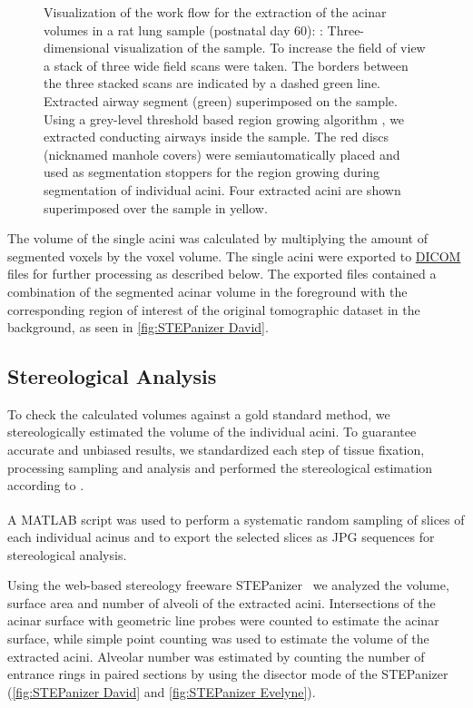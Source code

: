 \documentclass[a4paper,DIV=calc,abstract,english]{scrartcl}
\newlength\imagescale		%
\begin{document}
\begin{figure}[htb]
{\begin{tikzpicture}[x=\imagescale,y=-\imagescale]
		\end{tikzpicture}%
		\label{subfig:extracted acini}%
		}%
	\caption{%
		Visualization of the work flow for the extraction of the acinar volumes in a rat lung sample (postnatal day 60): %
		\protect{}: Three-dimensional visualization of the sample.
		To increase the field of view  a stack of three wide field scans were taken.
		The borders between the three stacked scans are indicated by a dashed green line. 
		\protect{} Extracted airway segment (green) superimposed on the sample.
		Using a grey-level threshold based region growing algorithm , we extracted conducting airways inside the sample.
		The red discs (nicknamed manhole covers) were semiautomatically placed and used as segmentation stoppers for the region growing during segmentation of individual acini.
		\protect{} Four extracted acini are shown superimposed over the sample in yellow.
	}
	\label{fig:workflow}
\end{figure}

The volume of the single acini was calculated by multiplying the amount of segmented voxels by the voxel volume.
The single acini were exported to \href{https://secure.wikimedia.org/wikipedia/en/w/index.php?title=Digital_Imaging_and_Communications_in_Medicine&oldid=415023605}{DICOM} files for further processing as described below.
The exported files contained a combination of the segmented acinar volume in the foreground with the corresponding region of interest of the original tomographic dataset in the background, as seen in \autoref{fig:STEPanizer David}.

\subsection{Stereological Analysis}
To check the calculated volumes against a gold standard method, we stereologically estimated the volume of the individual acini.
To guarantee accurate and unbiased results, we standardized each step of tissue fixation, processing sampling and analysis and performed the stereological estimation according to \citet{Hsia2010}.

A MATLAB\textsuperscript{\textregistered} script was used to perform a systematic random sampling of slices of each individual acinus and to export the selected slices as JPG sequences for stereological analysis.

Using the web-based stereology freeware STEPanizer~\cite[\url{http://stepanizer.com}]{Tschanz2011} we analyzed the volume, surface area and number of alveoli of the extracted acini.
Intersections of the acinar surface with geometric line probes were counted to estimate the acinar surface, while simple point counting was used to estimate the volume of the extracted acini.
Alveolar number was estimated by counting the number of entrance rings in paired sections by using the disector mode of the STEPanizer \cite{Hsia2010} (\autoref{fig:STEPanizer David} and \ref{fig:STEPanizer Evelyne}).
\end{document}
